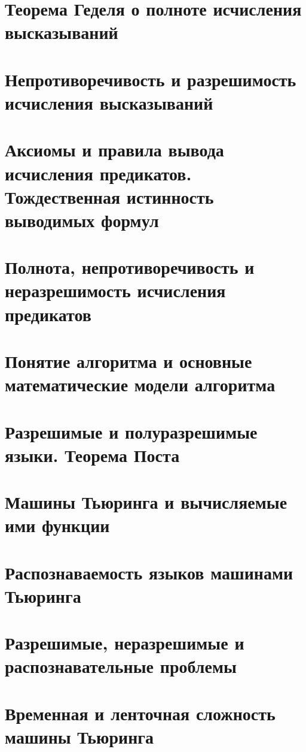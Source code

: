 \documentclass{Exams}
\begin{document}
\section{Теорема Геделя о полноте исчисления высказываний}


\section{Непротиворечивость и разрешимость исчисления высказываний}


\section{Аксиомы и правила вывода исчисления предикатов. Тождественная истинность выводимых формул}


\section{Полнота, непротиворечивость и неразрешимость исчисления предикатов}


\section{Понятие алгоритма и основные математические модели алгоритма}


\section{Разрешимые и полуразрешимые языки. Теорема Поста}


\section{Машины Тьюринга и вычисляемые ими функции}


\section{Распознаваемость языков машинами Тьюринга}

\section{Разрешимые, неразрешимые и распознавательные проблемы}


\section{Временная и ленточная сложность машины Тьюринга}

\end{document}

